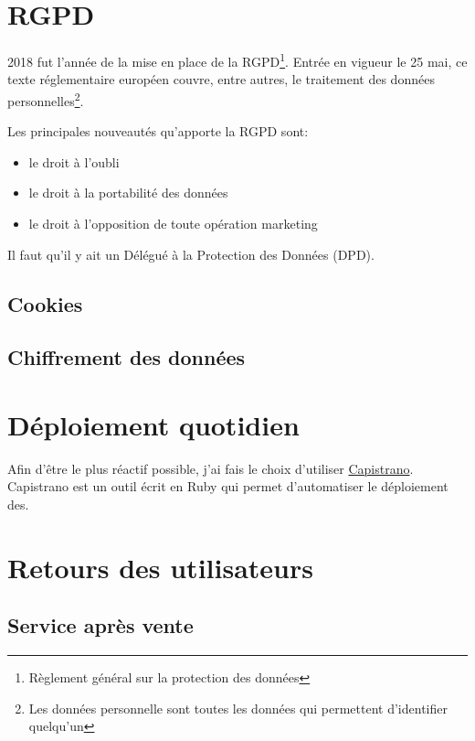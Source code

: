 \documentclass[]{report}
\begin{document}
  \section{RGPD}

    2018 fut l'année de la mise en place de la RGPD\footnote{Règlement général sur la protection des données}. Entrée en vigueur le 25 mai, ce texte réglementaire européen couvre, entre autres, le traitement des données personnelles\footnote{Les données personnelle sont toutes les données qui permettent d'identifier quelqu'un}.

    Les principales nouveautés qu'apporte la RGPD sont:

    \begin{itemize}
      \item le droit à l'oubli
      \item le droit à la portabilité des données
      \item le droit à l'opposition de toute opération marketing
    \end{itemize}

    Il faut qu'il y ait un Délégué à la Protection des Données (DPD).

    \subsection{Cookies}
    \subsection{Chiffrement des données}

  \section{Déploiement quotidien}

    Afin d'être le plus réactif possible, j'ai fais le choix d'utiliser \href{https://capistranorb.com}{Capistrano}. Capistrano est un outil écrit en Ruby qui permet d'automatiser le déploiement des.

  \section{Retours des utilisateurs}

    \subsection{Service après vente}
\end{document}
